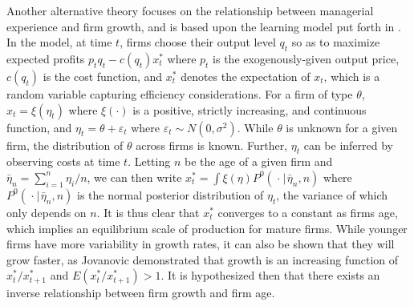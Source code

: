 \documentclass[english]{article}
\begin{document}
Another alternative theory focuses on the relationship between managerial 
experience and firm growth, and is based upon the learning model put forth in \citet{jovanovic1982}.
In the model, at time $t$, firms choose their output level $q_t$ so as to 
maximize expected profits $p_t q_t - c(q_t)x_t^*$ where $p_t$ is the 
exogenously-given output price, $c(q_t)$ is the cost function, and $x_t^*$ 
denotes the expectation of $x_t$, which is a random variable capturing 
efficiency considerations. 
For a firm of type $\theta$, $x_t = \xi (\eta_t)$ where $\xi (\cdot)$ is a 
positive, strictly increasing, and continuous function, and 
$\eta_t = \theta + \varepsilon_t$ where $\varepsilon_t \sim N(0,\sigma^2)$. 
While $\theta$ is unknown for a given firm, the distribution of $\theta$ across 
firms is known. 
Further, $\eta_t$ can be inferred by observing costs at time $t$. 
Letting $n$ be the age of a given firm and 
$\bar{\eta}_n = \sum_{i=1}^n \eta_i/n$, we can then write 
$x_t^* = \int \xi(\eta)P^0(\hspace{1pt} \cdot \hspace{1pt} | 
\hspace{1pt} \bar{\eta}_n, n)$ where $P^0(\hspace{1pt} \cdot 
\hspace{1pt} | \hspace{1pt} \bar{\eta}_n, n)$ is the normal posterior 
distribution of $\eta_t$, the variance of which only depends on $n$. 
It is thus clear that $x_t^*$ converges to a constant as firms age, which implies 
an equilibrium scale of production for mature firms. 
While younger firms have more variability in growth rates, it can also be 
shown that they will grow faster, as Jovanovic demonstrated that growth is an 
increasing function of $x_t^*/x_{t+1}^*$ and $E(x_t^*/x_{t+1}^*)>1$. 
It is hypothesized then that there exists an inverse relationship between 
firm growth and firm age.
\end{document}
